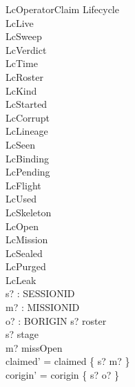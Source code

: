 \documentclass[a4paper,10pt,fleqn]{article}
\begin{document}
\begin{schema}{LcOperatorClaim}
\Delta Lifecycle \\
\Xi LcLive \\
\Xi LcSweep \\
\Xi LcVerdict \\
\Xi LcTime \\
\Xi LcRoster \\
\Xi LcKind \\
\Xi LcStarted \\
\Xi LcCorrupt \\
\Xi LcLineage \\
\Xi LcSeen \\
\Xi LcBinding \\
\Xi LcPending \\
\Xi LcFlight \\
\Xi LcUsed \\
\Xi LcSkeleton \\
\Xi LcOpen \\
\Xi LcMission \\
\Xi LcSealed \\
\Xi LcPurged \\
\Xi LcLeak \\
s? : SESSIONID \\
m? : MISSIONID \\
o? : BORIGIN
\where
s? \in roster \\
s? \notin \dom stage \\
m? \in missOpen \\
claimed' = claimed \oplus \{ s? \mapsto m? \} \\
corigin' = corigin \oplus \{ s? \mapsto o? \}
\end{schema}
\end{document}
